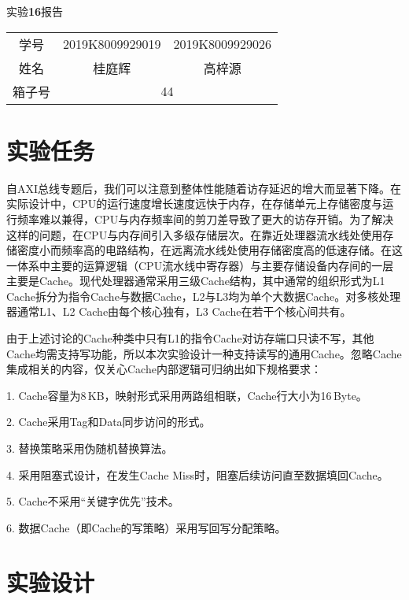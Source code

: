 \documentclass[UTF-8,twoside,c5size]{ctexart}
\begin{document}
	\begin{center}
		\heiti{}
		实验\textbf{16}报告
	\end{center}

	\begin{table*}[!h]
		\raggedleft
		\begin{tabular}{ccc}
			{\heiti 学号} & {2019K8009929019} & {2019K8009929026} \\
			{\heiti 姓名} & 桂庭辉 & 高梓源 \\
			{\heiti 箱子号} & \multicolumn{2}{c}{44}
		\end{tabular}
	\end{table*}
	
	\section{实验任务}
    自AXI总线专题后，我们可以注意到整体性能随着访存延迟的增大而显著下降。在实际设计中，CPU的运行速度增长速度远快于内存，在存储单元上存储密度与运行频率难以兼得，CPU与内存频率间的剪刀差导致了更大的访存开销。为了解决这样的问题，在CPU与内存间引入多级存储层次。在靠近处理器流水线处使用存储密度小而频率高的电路结构，在远离流水线处使用存储密度高的低速存储。在这一体系中主要的运算逻辑（CPU流水线中寄存器）与主要存储设备内存间的一层主要是Cache。现代处理器通常采用三级Cache结构，其中通常的组织形式为L1 Cache拆分为指令Cache与数据Cache，L2与L3均为单个大数据Cache。对多核处理器通常L1、L2 Cache由每个核心独有，L3 Cache在若干个核心间共有。
    
    由于上述讨论的Cache种类中只有L1的指令Cache对访存端口只读不写，其他Cache均需支持写功能，所以本次实验设计一种支持读写的通用Cache。忽略Cache集成相关的内容，仅关心Cache内部逻辑可归纳出如下规格要求：
    
    1. Cache容量为8\,KB，映射形式采用两路组相联，Cache行大小为16\,Byte。
    
    2. Cache采用Tag和Data同步访问的形式。
    
    3. 替换策略采用伪随机替换算法。
    
    4. 采用阻塞式设计，在发生Cache Miss时，阻塞后续访问直至数据填回Cache。

    5. Cache不采用“关键字优先”技术。
    
    6. 数据Cache（即Cache的写策略）采用写回写分配策略。
	
	\section{实验设计}	
	
\end{document}

